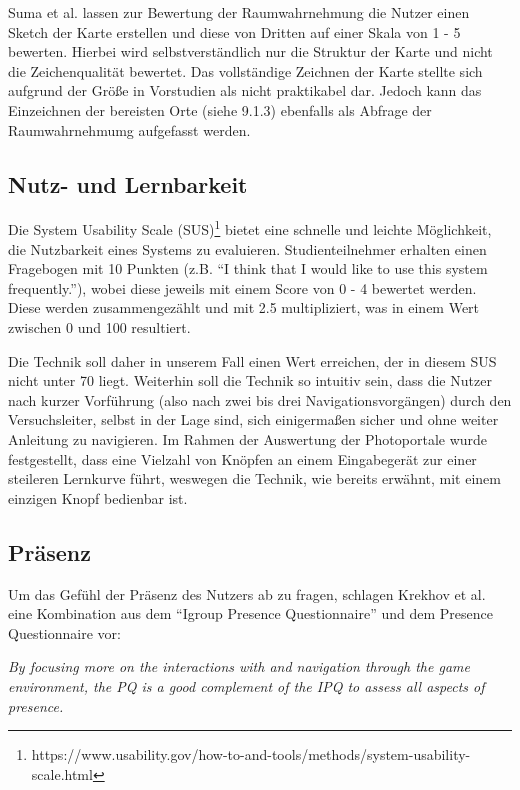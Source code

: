 Suma et al. \cite{Suma2010EvaluationEnvironments} lassen zur Bewertung der Raumwahrnehmung die Nutzer einen Sketch der Karte erstellen und diese von Dritten auf einer Skala von 1 - 5 bewerten. Hierbei wird selbstverständlich nur die Struktur der Karte und nicht die Zeichenqualität bewertet.
Das vollständige Zeichnen der Karte stellte sich aufgrund der Größe in Vorstudien als nicht praktikabel dar. Jedoch kann das Einzeichnen der bereisten Orte (siehe 9.1.3) ebenfalls als Abfrage der Raumwahrnehmumg aufgefasst werden.

\subsection{Nutz- und Lernbarkeit}
Die System Usability Scale (SUS)\footnote{https://www.usability.gov/how-to-and-tools/methods/system-usability-scale.html}
bietet eine schnelle und leichte Möglichkeit, die Nutzbarkeit eines Systems zu evaluieren. Studienteilnehmer erhalten einen Fragebogen mit 10 Punkten (z.B. “I think that I would like to use this system frequently.”), wobei diese jeweils mit einem Score von 0 - 4 bewertet werden. Diese werden zusammengezählt und mit 2.5 multipliziert, was in einem Wert zwischen 0 und 100 resultiert.

Die Technik soll daher in unserem Fall einen Wert erreichen, der in diesem SUS nicht unter 70 liegt. Weiterhin soll die Technik so intuitiv sein, dass die Nutzer nach kurzer Vorführung (also nach zwei bis drei Navigationsvorgängen) durch den Versuchsleiter, selbst in der Lage sind, sich einigermaßen sicher und ohne weiter Anleitung zu navigieren. Im Rahmen der Auswertung der Photoportale \cite{Kunert2014Photoportals} wurde festgestellt, dass eine Vielzahl von Knöpfen an einem Eingabegerät zur einer steileren Lernkurve führt, weswegen die Technik, wie bereits erwähnt, mit einem einzigen Knopf bedienbar ist.


\subsection{Präsenz}
Um das Gefühl der Präsenz des Nutzers ab zu fragen, schlagen Krekhov et al. \cite{Krekhov2018GulliVR} eine Kombination aus dem “Igroup Presence Questionnaire” \cite{witmer1998measuring} und dem Presence Questionnaire\cite{schubert1999} vor:

\begin{addmargin}[25pt]{0pt} 

\textit{By focusing more on the interactions with and navigation
through the game environment, the PQ is a good complement
of the IPQ to assess all aspects of presence.
}\cite{Krekhov2018GulliVR}

\end{addmargin}

